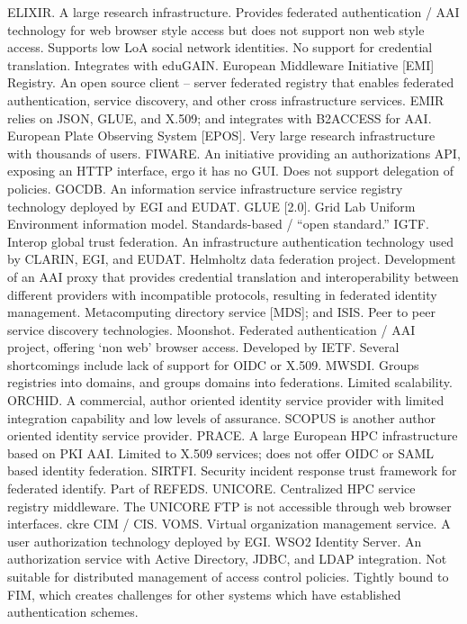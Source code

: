 \documentclass[12pt]{article}
\begin{document}
ELIXIR. A large research infrastructure. Provides federated authentication / AAI technology for web browser style access but does not support non web style access. Supports low LoA social network identities. No support for credential translation. Integrates with eduGAIN. 
European Middleware Initiative [EMI] Registry. An open source client – server federated registry that enables federated authentication, service discovery, and other cross infrastructure services. EMIR relies on JSON, GLUE, and X.509; and integrates with B2ACCESS for AAI. European Plate Observing System [EPOS]. Very large research infrastructure with thousands of users. 
FIWARE. An initiative providing an authorizations API, exposing an HTTP interface, ergo it has no GUI. Does not support delegation of policies. 
GOCDB. An information service infrastructure service registry technology deployed by EGI and EUDAT. 
GLUE [2.0]. Grid Lab Uniform Environment information model. Standards-based / “open standard.” 
IGTF. Interop global trust federation. An infrastructure authentication technology used by CLARIN, EGI, and EUDAT. 
Helmholtz data federation project. Development of an AAI proxy that provides credential translation and interoperability between different providers with incompatible protocols, resulting in federated identity management. 
Metacomputing directory service [MDS]; and ISIS. Peer to peer service discovery technologies. 
Moonshot. Federated authentication / AAI project, offering ‘non web’ browser access. Developed by IETF. Several shortcomings include lack of support for OIDC or X.509.
MWSDI. Groups registries into domains, and groups domains into federations. Limited scalability.
ORCHID. A commercial, author oriented identity service provider with limited integration capability and low levels of assurance. SCOPUS is another author oriented identity service provider. 
PRACE. A large European HPC infrastructure based on PKI AAI. Limited to X.509 services; does not offer OIDC or SAML based identity federation. 
SIRTFI. Security incident response trust framework for federated identify. Part of REFEDS. 
UNICORE. Centralized HPC service registry middleware. The UNICORE FTP is not accessible through web browser interfaces. ckre CIM / CIS.
VOMS. Virtual organization management service. A user authorization technology deployed by EGI. 
WSO2 Identity Server. An authorization service with Active Directory, JDBC, and LDAP integration. Not suitable for distributed management of access control policies. Tightly bound to FIM, which creates challenges for other systems which have established authentication schemes. 
\end{document}
